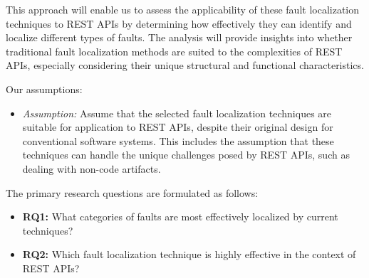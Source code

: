 \documentclass[conference]{IEEEtran}
\newcommand{\todo}[1]{\textcolor{red}{{\bfseries [[#1]]}}}
\begin{document}
    This approach will enable us to assess the applicability of these fault localization techniques to REST APIs by determining how effectively they can identify and localize different types of faults. 
    The analysis will provide insights into whether traditional fault localization methods are suited to the complexities of REST APIs, especially considering their unique structural and functional characteristics.



    Our assumptions:
    \begin{itemize}
        \item \textit{Assumption:} Assume that the selected fault localization techniques are suitable for application to REST APIs, despite their original design for conventional software systems. This includes the assumption that these techniques can handle the unique challenges posed by REST APIs, such as dealing with non-code artifacts.
    \end{itemize}


    The primary research questions are formulated as follows:
    \begin{itemize}
        \item \textbf{RQ1:} What categories of faults are most effectively localized by current techniques?
        \item \textbf{RQ2:} Which fault localization technique is highly effective in the context of REST APIs?
    \end{itemize}
\end{document}

